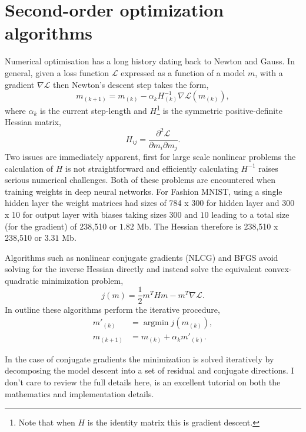 \documentclass[11pt,twocolumn]{article}
\DeclareMathOperator*{\argmin}{argmin}
\begin{document}
\section{Second-order optimization algorithms}\label{sec:optim}
Numerical optimisation \citep[see][]{Nocedal:Wright} has a long history dating back to Newton and Gauss. In general, given a loss function $\mathcal{L}$ expressed as a function of a model $m$, with a gradient $\nabla \mathcal{L}$ then Newton's descent step takes the form,
\begin{equation}
m_{(k+1)}=m_{(k)}- \alpha_{k} H_{(k)}^{-1} \nabla \mathcal{L}(m_{(k)}),
\end{equation}
where $\alpha_k$ is the current step-length and $H$\footnote{Note that when $H$ is the identity matrix this is gradient descent.} is the symmetric positive-definite Hessian matrix,
\begin{equation}
H_{ij}=\frac{\partial^2 \mathcal{L}}{\partial m_i \partial m_j}.
\end{equation}
Two issues are immediately apparent, first for large scale nonlinear problems the calculation of $H$ is not straightforward and efficiently calculating $H^{-1}$ raises serious numerical challenges. Both of these problems are encountered when training weights in deep neural networks. For Fashion MNIST, using a single hidden layer the weight matrices had sizes of 784 x 300 for hidden layer and 300 x 10 for output layer with biases taking sizes $300$ and $10$ leading to a total size (for the gradient) of 238,510 or $1.82$ Mb. The Hessian therefore is 238,510 x 238,510 or $3.31$ Mb. 

Algorithms such as nonlinear conjugate gradients (NLCG) and BFGS avoid solving for the inverse Hessian directly and instead solve the equivalent convex-quadratic minimization problem, 
\begin{equation}
j(m)=\frac{1}{2}m^THm-m^T\nabla \mathcal{L}.\label{my_obj}
\end{equation}   
In outline these algorithms perform the iterative procedure, 
\begin{align}
m'_{(k)}&=\argmin{j(m_{(k)})},\\
m_{(k+1)}&=m_{(k)}+\alpha_{k} m'_{(k)}.
\end{align}

In the case of conjugate gradients the minimization is solved iteratively by  decomposing the model descent into a set of residual and conjugate directions. I don't care to review the full details here, \citet{Shew:CGnopain} is an excellent tutorial on both the mathematics and implementation details.
\end{document}

